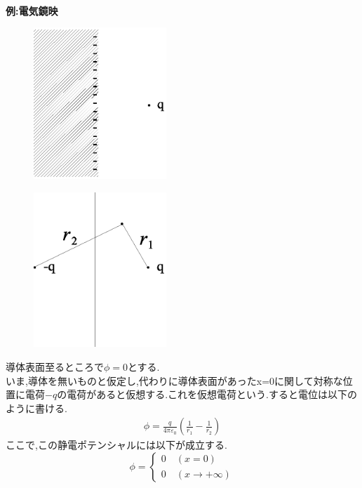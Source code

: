 \documentclass{jsarticle}
\begin{document}
\\
{\bf 例:電気鏡映} \\
\begin{figure}[htbp]
 \begin{center}
  \includegraphics[width=50mm]{7.3.eps}
 \end{center}
 \caption{}
 \label{fig:three}
\end{figure}
\begin{figure}[htbp]
 \begin{center}
  \includegraphics[width=50mm]{7.4.eps}
 \end{center}
 \caption{}
 \label{fig:four}
\end{figure}
導体表面至るところで$\phi=0$とする.\\
いま,導体を無いものと仮定し,代わりに導体表面があったx=0に関して対称な位置に電荷$-q$の電荷があると仮想する.これを仮想電荷という.すると電位は以下のように書ける.
\begin{eqnarray*}
\phi = \frac{q}{4 \pi \varepsilon_0} \left( \frac{1}{r_1} - \frac{1}{r_2} \right)
\end{eqnarray*}
ここで,この静電ポテンシャルには以下が成立する.
\begin{equation*}
\phi =\left \{
\begin{array}{l}
0 \quad (x=0)\\
0 \quad (x \to + \infty)
\end{array}
\right.
\end{equation*}
\end{document}

